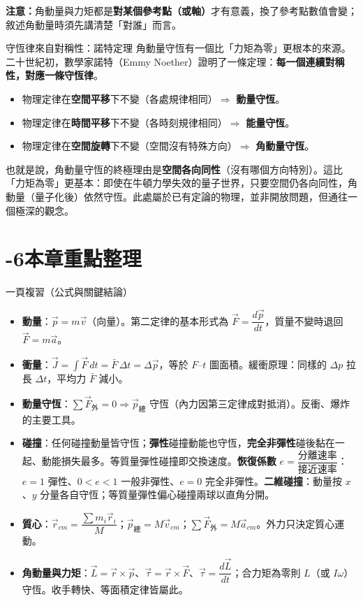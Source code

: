 \documentclass[11pt]{article}
\begin{document}
\textbf{注意：}角動量與力矩都是\textbf{對某個參考點（或軸）}才有意義，換了參考點數值會變；敘述角動量時須先講清楚「對誰」而言。

\begin{延伸框}{守恆律來自對稱性：諾特定理}
角動量守恆有一個比「力矩為零」更根本的來源。二十世紀初，數學家諾特（Emmy Noether）證明了一條定理：\textbf{每一個連續對稱性，對應一條守恆律}。
\begin{itemize}\setlength{\itemsep}{1pt}
\item 物理定律在\textbf{空間平移}下不變（各處規律相同）$\Rightarrow$ \textbf{動量守恆}。
\item 物理定律在\textbf{時間平移}下不變（各時刻規律相同）$\Rightarrow$ \textbf{能量守恆}。
\item 物理定律在\textbf{空間旋轉}下不變（空間沒有特殊方向）$\Rightarrow$ \textbf{角動量守恆}。
\end{itemize}
也就是說，角動量守恆的終極理由是\textbf{空間各向同性}（沒有哪個方向特別）。這比「力矩為零」更基本：即使在牛頓力學失效的量子世界，只要空間仍各向同性，角動量（量子化後）依然守恆。此處屬於已有定論的物理，並非開放問題，但通往一個極深的觀念。
\end{延伸框}

\section*{-6\quad 本章重點整理}

\begin{補充框}{一頁複習（公式與關鍵結論）}
\begin{itemize}\setlength{\itemsep}{2pt}
\item \textbf{動量}：$\vec p=m\vec v$（向量）。第二定律的基本形式為 $\vec F=\dfrac{d\vec p}{dt}$，質量不變時退回 $\vec F=m\vec a$。
\item \textbf{衝量}：$\vec J=\displaystyle\int\vec F\,dt=\bar F\,\Delta t=\Delta\vec p$，等於 $F$–$t$ 圖面積。緩衝原理：同樣的 $\Delta p$ 拉長 $\Delta t$，平均力 $\bar F$ 減小。
\item \textbf{動量守恆}：$\sum\vec F_{\text{外}}=0\Rightarrow\vec p_{\text{總}}$ 守恆（內力因第三定律成對抵消）。反衝、爆炸的主要工具。
\item \textbf{碰撞}：任何碰撞動量皆守恆；\textbf{彈性}碰撞動能也守恆，\textbf{完全非彈性}碰後黏在一起、動能損失最多。等質量彈性碰撞即交換速度。\textbf{恢復係數} $e=\dfrac{\text{分離速率}}{\text{接近速率}}$：$e=1$ 彈性、$0<e<1$ 一般非彈性、$e=0$ 完全非彈性。\textbf{二維碰撞}：動量按 $x$、$y$ 分量各自守恆；等質量彈性偏心碰撞兩球以直角分開。
\item \textbf{質心}：$\vec r_{cm}=\dfrac{\sum m_i\vec r_i}{M}$；$\vec p_{\text{總}}=M\vec v_{cm}$；$\sum\vec F_{\text{外}}=M\vec a_{cm}$。外力只決定質心運動。
\item \textbf{角動量與力矩}：$\vec L=\vec r\times\vec p$、$\vec\tau=\vec r\times\vec F$、$\vec\tau=\dfrac{d\vec L}{dt}$；合力矩為零則 $L$（或 $I\omega$）守恆。收手轉快、等面積定律皆屬此。
\end{itemize}
\end{補充框}
\end{document}
